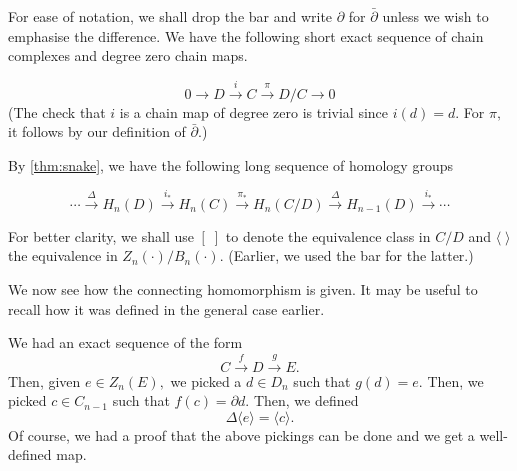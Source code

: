 \documentclass[12pt]{article}
\newenvironment{blockquote}
{\begin{mdframed}[skipabove=0pt, skipbelow=0pt, innertopmargin=4pt, innerbottommargin=4pt, bottomline=false,topline=false,rightline=false, linewidth=2pt]}
{\end{mdframed}}
\begin{document}
For ease of notation, we shall drop the bar and write $\partial$ for $\bar{\partial}$ unless we wish to emphasise the difference. We have the following short exact sequence of chain complexes and degree zero chain maps.

\begin{equation*} 
	0\to D\overset{i}{\longrightarrow}C\overset{\pi}{\longrightarrow}D/C\to 0
\end{equation*}
(The check that $i$ is a chain map of degree zero is trivial since $i(d) = d.$ For $\pi,$ it follows by our definition of $\bar{\partial}.$)

By \cref{thm:snake}, we have the following long sequence of homology groups

\begin{equation} \label{eq:homolongsnake}
	\cdots\overset{\Delta}{\longrightarrow}H_n(D)\overset{i_*}{\longrightarrow}H_n(C)\overset{\pi_*}{\longrightarrow}H_n(C/D)\overset{\Delta}{\longrightarrow}H_{n-1}(D)\overset{i_*}{\longrightarrow}\cdots
\end{equation}

For better clarity, we shall use $[\;]$ to denote the equivalence class in $C/D$ and $\langle \;\rangle$ the equivalence in $Z_n(\cdot)/B_n(\cdot).$ (Earlier, we used the bar for the latter.)

We now see how the connecting homomorphism is given. It may be useful to recall how it was defined in the general case earlier.\\

\begin{blockquote}
	We had an exact sequence of the form
	\begin{equation*} 
		C \overset{f}{\longrightarrow} D \overset{g}{\longrightarrow} E.
	\end{equation*}
	Then, given $e \in Z_{n}(E),$ we picked a $d \in D_n$ such that $g(d) = e.$ Then, we picked $c \in C_{n-1}$ such that $f(c) = \partial d.$ Then, we defined
	\begin{equation*} 
		\Delta\langle e\rangle = \langle c\rangle.
	\end{equation*}
	Of course, we had a proof that the above pickings can be done and we get a well-defined map. 
\end{blockquote}
\end{document}
